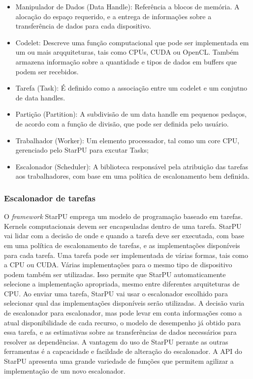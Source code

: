\begin{itemize}
	\item Manipulador de Dados (Data Handle): Referência a blocos de memória. A alocação do espaço requerido, e a entrega de informações sobre a transferência de dados para cada dispositivo.
	\item Codelet: Descreve uma função computacional que pode ser implementada em um ou mais arqquiteturas, tais como CPUs, CUDA ou OpenCL. Também armazena informação sobre a quantidade e tipos de dados em buffers que podem ser recebidos.
	\item Tarefa (Task): É definido como a  associação entre um codelet e um conjutno de data handles.
	\item Partição (Partition): A subdivisão de um data handle em pequenos pedaços, de acordo com a função de divisão, que pode ser definida pelo usuário.
	\item Trabalhador (Worker): Um elemento processador, tal como um core CPU, gerenciado pelo StarPU para excutar Tasks;
	\item Escalonador (Scheduler): A biblioteca responsável pela atribuição das tarefas aos trabalhadores, com base em uma política de escalonamento bem definida.

\end{itemize}


\subsubsection{Escalonador de tarefas}

O \textit{framework} StarPU emprega um modelo de programação baseado em tarefas. Kernels computacionais devem ser encapsuladas dentro de uma tarefa. StarPU vai lidar com a decisão de onde e quando a tarefa deve ser executada, com base em uma política de escalonamento de tarefas, e as implementações disponíveis para cada tarefa. Uma tarefa pode ser implementada de várias formas, tais como a CPU ou CUDA. Várias implementações para o mesmo tipo de dispositivo podem também ser utilizadas. Isso permite que StarPU automaticamente selecione a implementação apropriada, mesmo entre diferentes arquiteturas de CPU. Ao enviar uma tarefa, StarPU vai usar o escalonador escolhido para selecionar qual das implementações disponíveis serão utilizadas. A decisão varia de escalonador para escalonador, mas pode levar em conta informações como a atual disponibilidade de cada recurso, o modelo de desempenho já obtido para essa tarefa, e as estimativas sobre as transferências de dados necessários para resolver as dependências. A vantagem do uso de StarPU perante as outras ferramentas é a capcacidade e facildade de alteração do escalonador. A API do StarPU apresenta uma grande variedade de funções que permitem agilizar a implementação de um novo escalonador.


